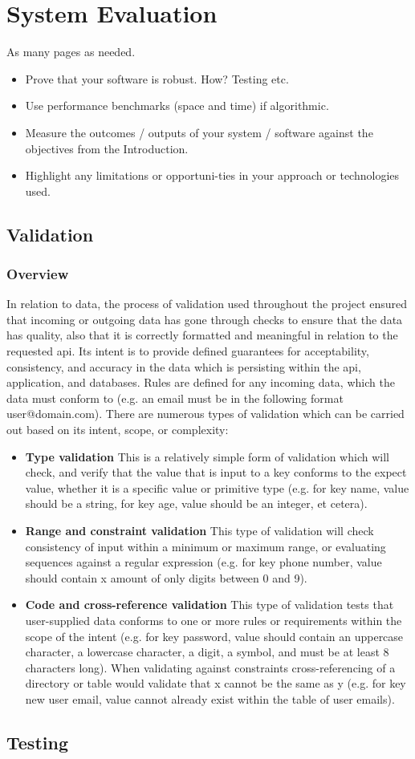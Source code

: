 \chapter{System Evaluation}
As many pages as needed.
\begin{itemize}
\item Prove that your software is robust. How? Testing etc. 
\item Use performance benchmarks (space and time) if algorithmic.
\item Measure the outcomes / outputs of your system / software against the objectives from the Introduction.
\item Highlight any limitations or opportuni-ties in your approach or technologies used.
\end{itemize}

\section{Validation}
\subsection{Overview}
	In relation to data, the process of validation used throughout the project ensured that incoming or outgoing data has gone through checks to ensure that the data has quality, also that it is correctly formatted and meaningful in relation to the requested api. Its intent is to provide defined guarantees for acceptability, consistency, and accuracy in the data which is persisting within the api, application, and databases. Rules are defined for any incoming data, which the data must conform to (e.g. an email must be in the following format user@domain.com). There are numerous types of validation which can be carried out based on its intent, scope, or complexity:
	\begin{itemize}
	\item \textbf{Type validation} This is a relatively simple form of validation which will check, and verify that the value that is input to a key conforms to the expect value, whether it is a specific value or primitive type (e.g. for key name, value should be a string, for key age, value should be an integer, et cetera). 
    \item \textbf{Range and constraint validation} This type of validation will check consistency of input within a minimum or maximum range, or evaluating sequences against a regular expression (e.g. for key phone number, value should contain x amount of only digits between 0 and 9).
    \item \textbf{Code and cross-reference validation} This type of validation tests that user-supplied data conforms to one or more rules or requirements within the scope of the intent (e.g. for key password, value should contain an uppercase character, a lowercase character, a digit, a symbol, and must be at least 8 characters long). When validating against constraints cross-referencing of a directory or table would validate that x cannot be the same as y (e.g. for key new user email, value cannot already exist within the table of user emails).
	\end{itemize}


\section{Testing}
